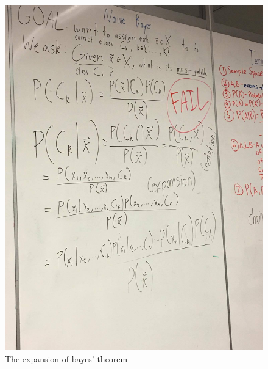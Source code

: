 \documentclass{article}
\begin{document}
\begin{figure}[htb]
\centering
\includegraphics[width=.9\linewidth]{./img/naive_bayes.jpg}
\caption{\label{fig:orgparagraph4}
The expansion of bayes' theorem}
\end{figure}
\end{document}
